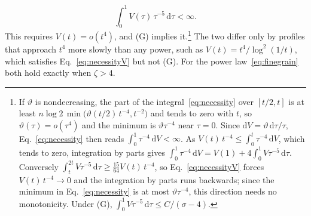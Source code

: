 \documentclass[aps,prd,10pt,twocolumn,superscriptaddress,nofootinbib,floatfix,longbibliography]{revtex4-2}
\newcommand{\dd}{\mathrm{d}}
\begin{document}
\begin{equation}
\label{eq:necessityV}
\int_0^1V(\tau)\,\tau^{-5}\,\dd\tau<\infty .
\end{equation}
This requires $V(t)=o(t^4)$, and (G) implies it.\footnote{If $\vartheta$ is nondecreasing, the part of the integral~\eqref{eq:necessity} over $[t/2,t]$ is at least $n\log2\,\min\bigl(\vartheta(t/2)\,t^{-4},t^{-2}\bigr)$ and tends to zero with $t$, so $\vartheta(\tau)=o(\tau^4)$ and the minimum is $\vartheta\tau^{-4}$ near $\tau=0$. Since $\dd V=\vartheta\,\dd\tau/\tau$, Eq.~\eqref{eq:necessity} then reads $\int_0^1\tau^{-4}\,\dd V<\infty$. As $V(t)\,t^{-4}\le\int_0^t\tau^{-4}\,\dd V$, which tends to zero, integration by parts gives $\int_0^1\tau^{-4}\,\dd V=V(1)+4\int_0^1V\tau^{-5}\,\dd\tau$. Conversely $\int_t^{2t}V\tau^{-5}\,\dd\tau\ge\frac{15}{64}V(t)\,t^{-4}$, so Eq.~\eqref{eq:necessityV} forces $V(t)\,t^{-4}\to0$ and the integration by parts runs backwards; since the minimum in Eq.~\eqref{eq:necessity} is at most $\vartheta\tau^{-4}$, this direction needs no monotonicity. Under (G), $\int_0^1V\tau^{-5}\,\dd\tau\le C/(\sigma-4)$.} The two differ only by profiles that approach $t^4$ more slowly than any power, such as $V(t)=t^4/\log^2(1/t)$, which satisfies Eq.~\eqref{eq:necessityV} but not (G). For the power law~\eqref{eq:finegrain} both hold exactly when $\zeta>4$.
\end{document}
